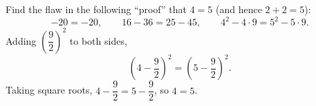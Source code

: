 Find the flaw in the following ``proof'' that $4=5$ (and hence $2+2=5$):
\[-20=-20,\qquad 16-36=25-45,\qquad 4^2-4\cdot9=5^2-5\cdot9.\]
Adding $\left(\dfrac92\right)^2$ to both sides,
\[\left(4-\dfrac92\right)^2=\left(5-\dfrac92\right)^2.\]
Taking square roots, $4-\dfrac92=5-\dfrac92$, so $4=5$.

